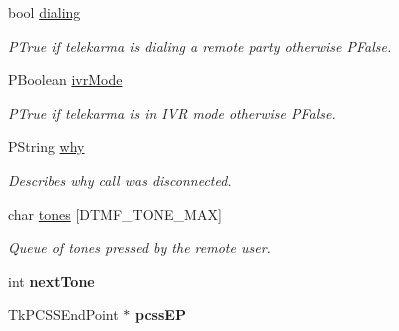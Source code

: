 \begin{CompactItemize}
\item 
\hypertarget{classTelephonyIfc_0ffb35f802c55694b5729e5bde971483}{
bool \hyperlink{classTelephonyIfc_0ffb35f802c55694b5729e5bde971483}{dialing}}
\label{classTelephonyIfc_0ffb35f802c55694b5729e5bde971483}

\begin{CompactList}\small\item\em PTrue if telekarma is dialing a remote party otherwise PFalse. \item\end{CompactList}\item 
\hypertarget{classTelephonyIfc_377903745950f7376b919c2a4456debd}{
PBoolean \hyperlink{classTelephonyIfc_377903745950f7376b919c2a4456debd}{ivrMode}}
\label{classTelephonyIfc_377903745950f7376b919c2a4456debd}

\begin{CompactList}\small\item\em PTrue if telekarma is in IVR mode otherwise PFalse. \item\end{CompactList}\item 
\hypertarget{classTelephonyIfc_f41ebe765b20a522ebd9c493c3bf77eb}{
PString \hyperlink{classTelephonyIfc_f41ebe765b20a522ebd9c493c3bf77eb}{why}}
\label{classTelephonyIfc_f41ebe765b20a522ebd9c493c3bf77eb}

\begin{CompactList}\small\item\em Describes why call was disconnected. \item\end{CompactList}\item 
\hypertarget{classTelephonyIfc_8c18969f7ee88659b8b118c530f79bcd}{
char \hyperlink{classTelephonyIfc_8c18969f7ee88659b8b118c530f79bcd}{tones} \mbox{[}DTMF\_\-TONE\_\-MAX\mbox{]}}
\label{classTelephonyIfc_8c18969f7ee88659b8b118c530f79bcd}

\begin{CompactList}\small\item\em Queue of tones pressed by the remote user. \item\end{CompactList}\item 
\hypertarget{classTelephonyIfc_b857d1530a322453a8788c9bffbcc833}{
int \textbf{nextTone}}
\label{classTelephonyIfc_b857d1530a322453a8788c9bffbcc833}

\item 
\hypertarget{classTelephonyIfc_692107ad53586332c50b34ea3b51f76d}{
TkPCSSEndPoint $\ast$ \textbf{pcssEP}}
\label{classTelephonyIfc_692107ad53586332c50b34ea3b51f76d}


\end{CompactItemize}
